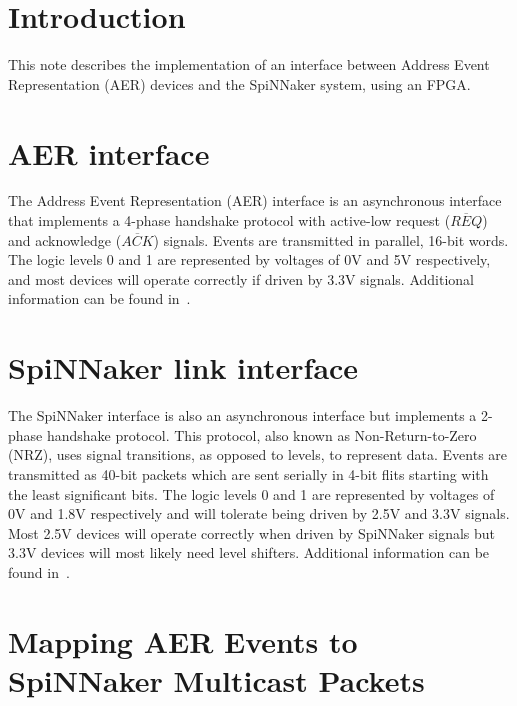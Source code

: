 
\def\FullTitle{Interfacing AER devices to SpiNNaker\\ using an FPGA}
\def\ShortTitle{SpiNNaker - AER interface}
\def\Date{03 Apr 2014}
\def\Version{1.1}
\def\Author{Luis A. Plana}
\def\Email{luis.plana@manchester.ac.uk}



\section{Introduction}


This note describes the implementation of an interface between
Address Event Representation (AER) devices and the SpiNNaker system,
using an FPGA.


\section{AER interface}

The Address Event Representation (AER) interface is an asynchronous
interface that implements a 4-phase handshake protocol with active-low
request ($\overline{REQ}$) and acknowledge ($\overline{ACK}$)
signals. Events are transmitted in parallel, 16-bit words. The logic
levels 0 and 1 are represented by voltages of 0V and 5V respectively,
and most devices will operate correctly if driven by 3.3V
signals. Additional information can be found in~\cite{AER}.


\section{SpiNNaker link interface}

The SpiNNaker interface is also an asynchronous interface but
implements a 2-phase handshake protocol. This protocol, also known as
Non-Return-to-Zero (NRZ), uses signal transitions, as opposed to
levels, to represent data. Events are transmitted as 40-bit packets
which are sent serially in 4-bit flits starting with the least
significant bits. The logic levels 0 and 1 are represented by voltages
of 0V and 1.8V respectively and will tolerate being driven by 2.5V and
3.3V signals. Most 2.5V devices will operate correctly when driven by
SpiNNaker signals but 3.3V devices will most likely need level
shifters. Additional information can be found in~\cite{spinn-app-7}.


\section{Mapping AER Events to SpiNNaker Multicast Packets}


